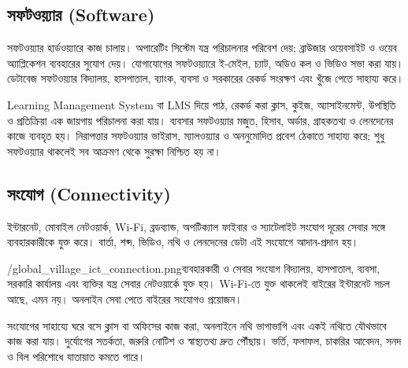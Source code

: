 \begin{topicbody}
\subsection{সফটওয়্যার (Software)}
সফটওয়্যার হার্ডওয়্যারে কাজ চালায়। অপারেটিং সিস্টেম যন্ত্র পরিচালনার পরিবেশ দেয়; ব্রাউজার ওয়েবসাইট ও ওয়েব অ্যাপ্লিকেশন ব্যবহারের সুযোগ দেয়। যোগাযোগের সফটওয়্যারে ই-মেইল, চ্যাট, অডিও কল ও ভিডিও সভা করা যায়। ডেটাবেজ সফটওয়্যার বিদ্যালয়, হাসপাতাল, ব্যাংক, ব্যবসা ও সরকারের রেকর্ড সংরক্ষণ এবং খুঁজে পেতে সাহায্য করে।

Learning Management System বা LMS দিয়ে পাঠ, রেকর্ড করা ক্লাস, কুইজ, অ্যাসাইনমেন্ট, উপস্থিতি ও প্রতিক্রিয়া এক জায়গায় পরিচালনা করা যায়। ব্যবসার সফটওয়্যার মজুত, হিসাব, অর্ডার, গ্রাহকতথ্য ও লেনদেনের কাজে ব্যবহৃত হয়। নিরাপত্তার সফটওয়্যার ভাইরাস, ম্যালওয়্যার ও অননুমোদিত প্রবেশ ঠেকাতে সাহায্য করে; শুধু সফটওয়্যার থাকলেই সব আক্রমণ থেকে সুরক্ষা নিশ্চিত হয় না।

\subsection{সংযোগ (Connectivity)}
ইন্টারনেট, মোবাইল নেটওয়ার্ক, Wi-Fi, ব্রডব্যান্ড, অপটিক্যাল ফাইবার ও স্যাটেলাইট সংযোগ দূরের সেবার সঙ্গে ব্যবহারকারীকে যুক্ত করে। বার্তা, শব্দ, ভিডিও, নথি ও লেনদেনের ডেটা এই সংযোগে আদান-প্রদান হয়।
\begin{rightimageblock}{\chaponeimg/global_village_ict_connection.png}{ব্যবহারকারী ও সেবার সংযোগ}
বিদ্যালয়, হাসপাতাল, ব্যবসা, সরকারি কার্যালয় এবং ব্যক্তির যন্ত্র সেবার নেটওয়ার্কে যুক্ত হয়। Wi-Fi-তে যুক্ত থাকলেই বাইরের ইন্টারনেট সচল আছে, এমন নয়। অনলাইন সেবা পেতে বাইরের সংযোগও প্রয়োজন।
\end{rightimageblock}\label{fig:ch1-pair-6}
সংযোগের সাহায্যে ঘরে বসে ক্লাস বা অফিসের কাজ করা, অনলাইনে নথি ভাগাভাগি এবং একই নথিতে যৌথভাবে কাজ করা যায়। দুর্যোগের সতর্কতা, জরুরি নোটিশ ও স্বাস্থ্যতথ্য দ্রুত পৌঁছায়। ভর্তি, ফলাফল, চাকরির আবেদন, সনদ ও বিল পরিশোধে যাতায়াত কমতে পারে।


\end{topicbody}
